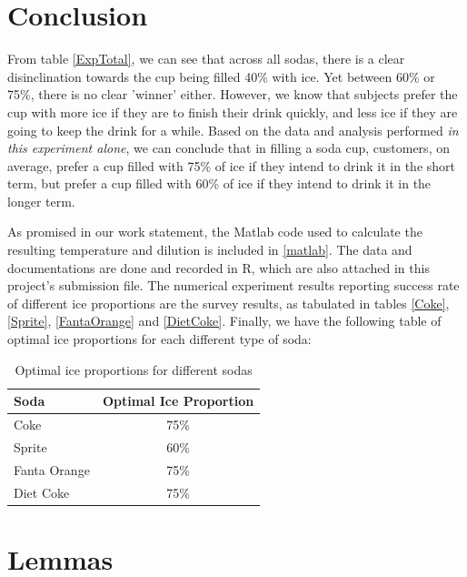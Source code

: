 \documentclass[oneside,12pt]{report}
\def\prefacesection#1{
\chapter*{#1}
\addcontentsline{toc}{chapter}{#1}
}
\begin{document}
%

\prefacesection{Conclusion}


\vspace{12pt}
\noindent From table \ref{ExpTotal}, we can see that across all sodas, there is a clear disinclination towards the cup being filled 40\% with ice. Yet between 60\% or 75\%, there is no clear 'winner' either. However, we know that subjects prefer the cup with more ice if they are to finish their drink quickly, and less ice if they are going to keep the drink for a while. Based on the data and analysis performed \emph{in this experiment alone}, we can conclude that in filling a soda cup, customers, on average, prefer a cup filled with 75\% of ice if they intend to drink it in the short term, but prefer a cup filled with 60\% of ice if they intend to drink it in the longer term. 

\vspace{12pt}
\noindent As promised in our work statement, the Matlab code used to calculate the resulting temperature and dilution is included in \ref{matlab}. The data and documentations are done and recorded in R, which are also attached in this project's submission file. The numerical experiment results reporting success rate of different ice proportions are the survey results, as tabulated in tables \ref{Coke}, \ref{Sprite}, \ref{FantaOrange} and \ref{DietCoke}. Finally, we have the following table of optimal ice proportions for each different type of soda:
\vspace{6pt}
\begin{table}[ h]
\centering
\begin{tabular}{ l || c}
 Soda & Optimal Ice Proportion \\
\hline  
Coke & 75\% \\ 
\hline  
Sprite & 60\% \\ 
\hline 
Fanta Orange & 75\% \\ 
\hline 
Diet Coke & 75\% \\ 

\end{tabular}
\caption{Optimal ice proportions for different sodas}
\label{FinalTable}
\end{table}


\appendix
{}

\chapter{Lemmas}\label{Lemma}
\vspace{12pt} 
\end{document}
